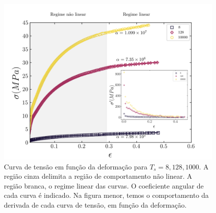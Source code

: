 \documentclass{report}
\begin{document}
        \begin{figure}[H]
            \centering
            \includegraphics[width=\textwidth]{figures/stress_fit.png}

            \caption{Curva de tensão em função da deformação para \(T_{s} = 8, 128, 1000\). A região cinza delimita a 
            região de comportamento não linear. A região branca, o regime linear das curvas. O coeficiente angular de cada 
            curva é indicado. Na figura menor, temos o comportamento da derivada de cada curva de tensão, em função da 
            deformação.} 

            \label{R8}
        \end{figure}
\end{document}
